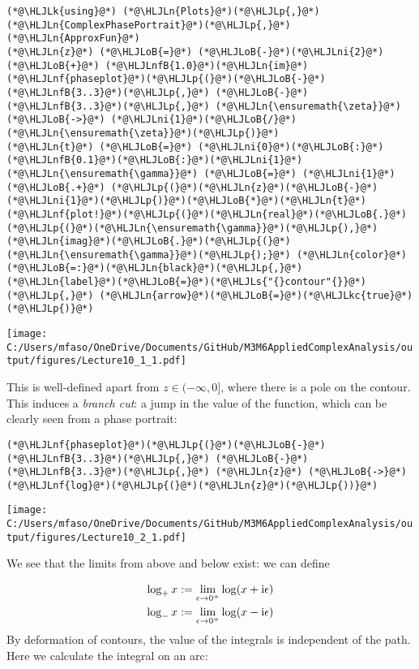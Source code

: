 \documentclass[12pt,a4paper]{article}
\newcommand{\HLJLk}[1]{\textcolor[RGB]{148,91,176}{\textbf{#1}}}
\newcommand{\HLJLkc}[1]{\textcolor[RGB]{59,151,46}{\textit{#1}}}
\newcommand{\HLJLn}[1]{#1}
\newcommand{\HLJLnf}[1]{\textcolor[RGB]{66,102,213}{#1}}
\newcommand{\HLJLs}[1]{\textcolor[RGB]{201,61,57}{#1}}
\newcommand{\HLJLnfB}[1]{\textcolor[RGB]{59,151,46}{#1}}
\newcommand{\HLJLni}[1]{\textcolor[RGB]{59,151,46}{#1}}
\newcommand{\HLJLoB}[1]{\textcolor[RGB]{102,102,102}{\textbf{#1}}}
\newcommand{\HLJLp}[1]{#1}
\def\I{ {\rm i} }
\begin{document}
\begin{lstlisting}
(*@\HLJLk{using}@*) (*@\HLJLn{Plots}@*)(*@\HLJLp{,}@*) (*@\HLJLn{ComplexPhasePortrait}@*)(*@\HLJLp{,}@*) (*@\HLJLn{ApproxFun}@*)
(*@\HLJLn{z}@*) (*@\HLJLoB{=}@*) (*@\HLJLoB{-}@*)(*@\HLJLni{2}@*) (*@\HLJLoB{+}@*) (*@\HLJLnfB{1.0}@*)(*@\HLJLn{im}@*)
(*@\HLJLnf{phaseplot}@*)(*@\HLJLp{(}@*)(*@\HLJLoB{-}@*)(*@\HLJLnfB{3..3}@*)(*@\HLJLp{,}@*) (*@\HLJLoB{-}@*)(*@\HLJLnfB{3..3}@*)(*@\HLJLp{,}@*) (*@\HLJLn{\ensuremath{\zeta}}@*) (*@\HLJLoB{->}@*) (*@\HLJLni{1}@*)(*@\HLJLoB{/}@*)(*@\HLJLn{\ensuremath{\zeta}}@*)(*@\HLJLp{)}@*)
(*@\HLJLn{t}@*) (*@\HLJLoB{=}@*) (*@\HLJLni{0}@*)(*@\HLJLoB{:}@*)(*@\HLJLnfB{0.1}@*)(*@\HLJLoB{:}@*)(*@\HLJLni{1}@*)
(*@\HLJLn{\ensuremath{\gamma}}@*) (*@\HLJLoB{=}@*) (*@\HLJLni{1}@*) (*@\HLJLoB{.+}@*) (*@\HLJLp{(}@*)(*@\HLJLn{z}@*)(*@\HLJLoB{-}@*)(*@\HLJLni{1}@*)(*@\HLJLp{)}@*)(*@\HLJLoB{*}@*)(*@\HLJLn{t}@*)
(*@\HLJLnf{plot!}@*)(*@\HLJLp{(}@*)(*@\HLJLn{real}@*)(*@\HLJLoB{.}@*)(*@\HLJLp{(}@*)(*@\HLJLn{\ensuremath{\gamma}}@*)(*@\HLJLp{),}@*) (*@\HLJLn{imag}@*)(*@\HLJLoB{.}@*)(*@\HLJLp{(}@*)(*@\HLJLn{\ensuremath{\gamma}}@*)(*@\HLJLp{);}@*) (*@\HLJLn{color}@*)(*@\HLJLoB{=:}@*)(*@\HLJLn{black}@*)(*@\HLJLp{,}@*) (*@\HLJLn{label}@*)(*@\HLJLoB{=}@*)(*@\HLJLs{"{}contour"{}}@*)(*@\HLJLp{,}@*) (*@\HLJLn{arrow}@*)(*@\HLJLoB{=}@*)(*@\HLJLkc{true}@*)(*@\HLJLp{)}@*)
\end{lstlisting}

\texttt{[image: C:/Users/mfaso/OneDrive/Documents/GitHub/M3M6AppliedComplexAnalysis/output/figures/Lecture10\_1\_1.pdf]}

This is well-defined apart from $z \in (-\infty,0]$, where there is a pole on the contour. This induces a \emph{branch cut}: a jump in the value of the function, which can be clearly seen from a phase portrait:


\begin{lstlisting}
(*@\HLJLnf{phaseplot}@*)(*@\HLJLp{(}@*)(*@\HLJLoB{-}@*)(*@\HLJLnfB{3..3}@*)(*@\HLJLp{,}@*) (*@\HLJLoB{-}@*)(*@\HLJLnfB{3..3}@*)(*@\HLJLp{,}@*) (*@\HLJLn{z}@*) (*@\HLJLoB{->}@*) (*@\HLJLnf{log}@*)(*@\HLJLp{(}@*)(*@\HLJLn{z}@*)(*@\HLJLp{))}@*)
\end{lstlisting}

\texttt{[image: C:/Users/mfaso/OneDrive/Documents/GitHub/M3M6AppliedComplexAnalysis/output/figures/Lecture10\_2\_1.pdf]}

We see that the limits from above and below exist: we can define


\begin{align*}
\log_+ x &:= \lim_{\epsilon \rightarrow 0^+} \log(x+\I \epsilon) \\
\log_- x &:= \lim_{\epsilon \rightarrow 0^+} \log(x-\I \epsilon)
\end{align*}
By deformation of contours, the value of the integrals is independent of the path. Here we calculate the integral on an arc:
\end{document}
